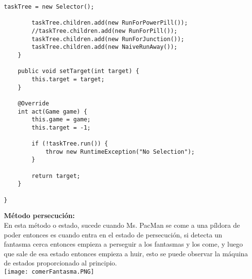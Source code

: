 \documentclass[11pt]{article}
\begin{document}
\begin{lstlisting}[frame=single]
		taskTree = new Selector();
		
		taskTree.children.add(new RunForPowerPill());
		//taskTree.children.add(new RunForPill());
		taskTree.children.add(new RunForJunction());
		taskTree.children.add(new NaiveRunAway());
	}
	
	public void setTarget(int target) {
		this.target = target;
	}

	@Override
	int act(Game game) {
		this.game = game;
		this.target = -1;
		
		if (!taskTree.run()) {
			throw new RuntimeException("No Selection");
		}
		
		return target;
	}

}

\end{lstlisting}

\newpage
\textbf{Método persecución:}\\
 \linebreak
En esta método o estado, sucede cuando Ms. PacMan se come a una píldora de poder entonces es cuando entra en el estado de persecución, si detecta un fantasma cerca entonces empieza  a perseguir a los fantasmas y los come, y luego que sale de esa estado entonces empieza a huir, esto se puede observar la máquina de estados proporcionado al principio.\\
\linebreak
\texttt{[image: comerFantasma.PNG]} \\
\linebreak
\end{document}
